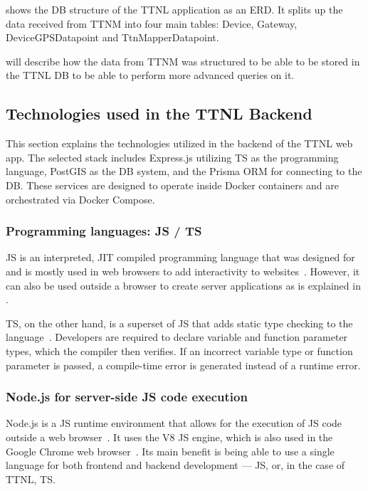  shows the \ac{DB} structure of the \ac{TTNL} application as an \ac{ERD}.
It splits up the data received from \ac{TTNM} into four main tables: Device, Gateway, DeviceGPSDatapoint and TtnMapperDatapoint.

 will describe how the data from \ac{TTNM} was structured to be able to be stored in the \ac{TTNL} \ac{DB} to be able to perform more advanced queries on it.

\subsection{Technologies used in the \acl{TTNL} Backend}

This section explains the technologies utilized in the backend of the \ac{TTNL} web app.
The selected stack includes Express.js utilizing \ac{TS} as the programming language, PostGIS as the \ac{DB} system, and the Prisma \ac{ORM} for connecting to the \ac{DB}.
These services are designed to operate inside Docker containers and are orchestrated via Docker Compose.

\subsubsection{Programming languages: \acl{JS} / \acl{TS}}

\ac{JS} is an interpreted, \ac{JIT} compiled programming language that was designed for and is mostly used in web browsers to add interactivity to websites~\cite{mdn_javascript_2023}.
However, it can also be used outside a browser to create server applications as is explained in .

\ac{TS}, on the other hand, is a superset of \ac{JS} that adds static type checking to the language~\cite{microsoft_javascript_nodate}.
Developers are required to declare variable and function parameter types, which the compiler then verifies.
If an incorrect variable type or function parameter is passed, a compile-time error is generated instead of a runtime error.

\subsubsection{Node.js for server-side \acl{JS} code execution}\label{sec:nodejs}

Node.js is a \ac{JS} runtime environment that allows for the execution of \ac{JS} code outside a web browser~\cite{openjs_foundation_nodejs_nodate}.
It uses the V8 \ac{JS} engine, which is also used in the Google Chrome web browser~\cite{google_llc_v8_nodate}.
Its main benefit is being able to use a single language for both frontend and backend development --- \ac{JS}, or, in the case of \ac{TTNL}, \ac{TS}.

